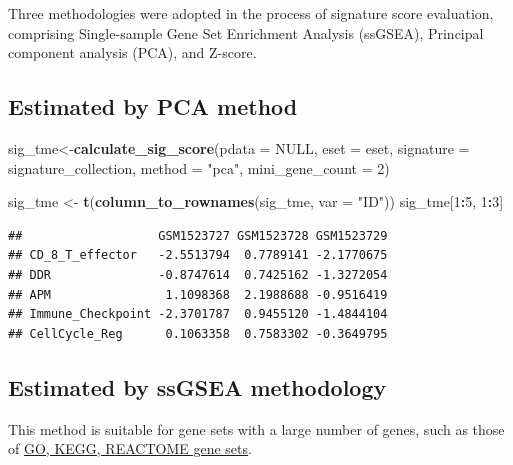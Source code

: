 \documentclass[
  12pt,
]{book}
\newenvironment{Shaded}{\begin{snugshade}}{\end{snugshade}}
\newcommand{\AttributeTok}[1]{\textcolor[rgb]{0.13,0.29,0.53}{#1}}
\newcommand{\ConstantTok}[1]{\textcolor[rgb]{0.56,0.35,0.01}{#1}}
\newcommand{\DecValTok}[1]{\textcolor[rgb]{0.00,0.00,0.81}{#1}}
\newcommand{\FunctionTok}[1]{\textcolor[rgb]{0.13,0.29,0.53}{\textbf{#1}}}
\newcommand{\NormalTok}[1]{#1}
\newcommand{\OtherTok}[1]{\textcolor[rgb]{0.56,0.35,0.01}{#1}}
\newcommand{\SpecialCharTok}[1]{\textcolor[rgb]{0.81,0.36,0.00}{\textbf{#1}}}
\newcommand{\StringTok}[1]{\textcolor[rgb]{0.31,0.60,0.02}{#1}}
\begin{document}
Three methodologies were adopted in the process of signature score evaluation, comprising Single-sample Gene Set Enrichment Analysis (ssGSEA), Principal component analysis (PCA), and Z-score.

\hypertarget{estimated-by-pca-method}{%
\subsection{Estimated by PCA method}\label{estimated-by-pca-method}}

\begin{Shaded}
\begin{Highlighting}[]
\NormalTok{sig\_tme}\OtherTok{\textless{}{-}}\FunctionTok{calculate\_sig\_score}\NormalTok{(}\AttributeTok{pdata           =} \ConstantTok{NULL}\NormalTok{,}
                             \AttributeTok{eset            =}\NormalTok{ eset,}
                             \AttributeTok{signature       =}\NormalTok{ signature\_collection,}
                             \AttributeTok{method          =} \StringTok{"pca"}\NormalTok{,}
                             \AttributeTok{mini\_gene\_count =} \DecValTok{2}\NormalTok{)}

\NormalTok{sig\_tme }\OtherTok{\textless{}{-}} \FunctionTok{t}\NormalTok{(}\FunctionTok{column\_to\_rownames}\NormalTok{(sig\_tme, }\AttributeTok{var =} \StringTok{"ID"}\NormalTok{))}
\NormalTok{sig\_tme[}\DecValTok{1}\SpecialCharTok{:}\DecValTok{5}\NormalTok{, }\DecValTok{1}\SpecialCharTok{:}\DecValTok{3}\NormalTok{]}
\end{Highlighting}
\end{Shaded}

\begin{verbatim}
##                   GSM1523727 GSM1523728 GSM1523729
## CD_8_T_effector   -2.5513794  0.7789141 -2.1770675
## DDR               -0.8747614  0.7425162 -1.3272054
## APM                1.1098368  2.1988688 -0.9516419
## Immune_Checkpoint -2.3701787  0.9455120 -1.4844104
## CellCycle_Reg      0.1063358  0.7583302 -0.3649795
\end{verbatim}

\hypertarget{estimated-by-ssgsea-methodology}{%
\subsection{Estimated by ssGSEA methodology}\label{estimated-by-ssgsea-methodology}}

This method is suitable for gene sets with a large number of genes, such as those of \href{https://www.gsea-msigdb.org/gsea/msigdb}{GO, KEGG, REACTOME gene sets}.
\end{document}

